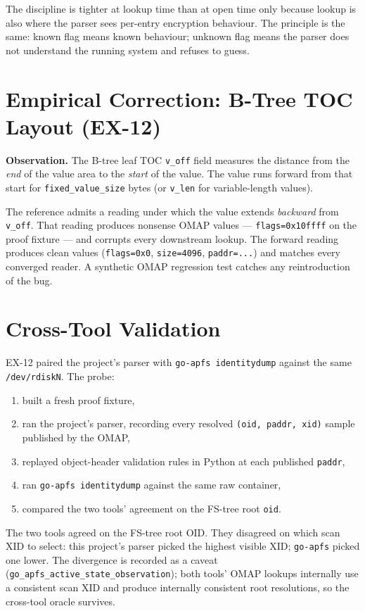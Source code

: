 The discipline is tighter at lookup time than at open time only
because lookup is also where the parser sees per-entry encryption
behaviour. The principle is the same: known flag means known
behaviour; unknown flag means the parser does not understand the
running system and refuses to guess.

\section{Empirical Correction: B-Tree TOC Layout (EX-12)}

\textbf{Observation.} The B-tree leaf TOC \texttt{v\_off} field
measures the distance from the \emph{end} of the value area to the
\emph{start} of the value. The value runs forward from that start
for \texttt{fixed\_value\_size} bytes (or \texttt{v\_len} for
variable-length values).

The reference admits a reading under which the value extends
\emph{backward} from \texttt{v\_off}. That reading produces
nonsense OMAP values --- \texttt{flags=0x10ffff} on the proof
fixture --- and corrupts every downstream lookup. The forward
reading produces clean values (\texttt{flags=0x0},
\texttt{size=4096}, \texttt{paddr=...}) and matches every
converged reader. A synthetic OMAP regression test catches any
reintroduction of the bug.

\section{Cross-Tool Validation}

EX-12 paired the project's parser with \texttt{go-apfs identitydump}
against the same \texttt{/dev/rdiskN}. The probe:

\begin{enumerate}
  \item built a fresh proof fixture,
  \item ran the project's parser, recording every resolved
    \texttt{(oid, paddr, xid)} sample published by the OMAP,
  \item replayed object-header validation rules in Python at each
    published \texttt{paddr},
  \item ran \texttt{go-apfs identitydump} against the same raw
    container,
  \item compared the two tools' agreement on the FS-tree root
    \texttt{oid}.
\end{enumerate}

The two tools agreed on the FS-tree root OID. They disagreed on
which scan XID to select: this project's parser picked the highest
visible XID; \texttt{go-apfs} picked one lower. The divergence is
recorded as a caveat
(\texttt{go\_apfs\_active\_state\_observation}); both tools' OMAP
lookups internally use a consistent scan XID and produce internally
consistent root resolutions, so the cross-tool oracle survives.

